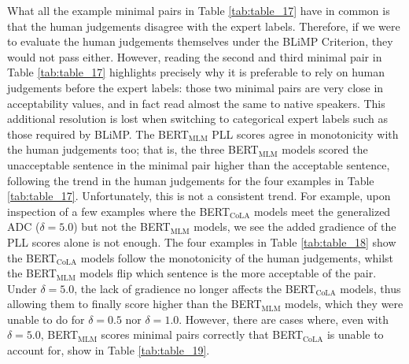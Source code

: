 What all the example minimal pairs in Table \ref{tab:table_17} have in common is that the human judgements disagree with the expert labels.  Therefore, if we were to evaluate the human judgements themselves under the BLiMP Criterion, they would not pass either.  However, reading the second and third minimal pair in Table \ref{tab:table_17} highlights precisely why it is preferable to rely on human judgements before the expert labels: those two minimal pairs are very close in acceptability values, and in fact read almost the same to native speakers.  This additional resolution is lost when switching to categorical expert labels such as those required by BLiMP.  The BERT$_{\mathrm{MLM}}$ PLL scores agree in monotonicity with the human judgements too; that is, the three BERT$_{\mathrm{MLM}}$ models scored the unacceptable sentence in the minimal pair higher than the acceptable sentence, following the trend in the human judgements for the four examples in Table \ref{tab:table_17}.  Unfortunately, this is not a consistent trend.  For example, upon inspection of a few examples where the BERT$_{\mathrm{CoLA}}$ models meet the generalized ADC ($\delta=5.0$) but not the BERT$_{\mathrm{MLM}}$ models, we see the added gradience of the PLL scores alone is not enough.  The four examples in Table \ref{tab:table_18} show the BERT$_{\mathrm{CoLA}}$ models follow the monotonicity of the human judgements, whilst the BERT$_{\mathrm{MLM}}$ models flip which sentence is the more acceptable of the pair.  Under $\delta=5.0$, the lack of gradience no longer affects the BERT$_{\mathrm{CoLA}}$ models, thus allowing them to finally score higher than the BERT$_{\mathrm{MLM}}$ models, which they were unable to do for $\delta=0.5$ nor $\delta=1.0$.  However, there are cases where, even with $\delta=5.0$, BERT$_{\mathrm{MLM}}$ scores minimal pairs correctly that BERT$_{\mathrm{CoLA}}$ is unable to account for, show in Table \ref{tab:table_19}.


